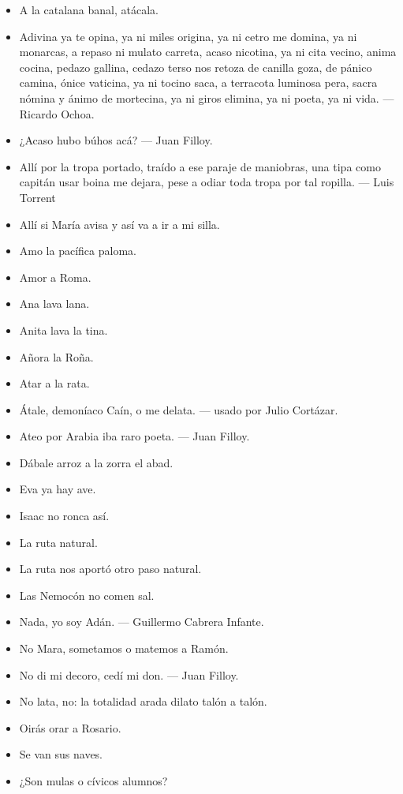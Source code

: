 \documentclass[10pt,a4paper]{article}
\begin{document}
	\begin{itemize}
		\item A la catalana banal, atácala.
		\item Adivina ya te opina, ya ni miles origina, ya ni cetro me domina, ya ni monarcas, a repaso ni mulato carreta, acaso nicotina, ya ni cita vecino, anima cocina, pedazo gallina, cedazo terso nos retoza de canilla goza, de pánico camina, ónice vaticina, ya ni tocino saca, a terracota luminosa pera, sacra nómina y ánimo de mortecina, ya ni giros elimina, ya ni poeta, ya ni vida. --- Ricardo Ochoa.
		\item ¿Acaso hubo búhos acá? --- Juan Filloy.
		\item Allí por la tropa portado, traído a ese paraje de maniobras, una tipa como capitán usar boina me dejara, pese a odiar toda tropa por tal ropilla. --- Luis Torrent
		\item Allí si María avisa y así va a ir a mi silla.
		\item Amo la pacífica paloma.
		\item Amor a Roma.
		\item Ana lava lana.
		\item Anita lava la tina.
		\item Añora la Roña.
		\item Atar a la rata.
		\item Átale, demoníaco Caín, o me delata. --- usado por Julio Cortázar.
		\item Ateo por Arabia iba raro poeta. --- Juan Filloy.
		\item Dábale arroz a la zorra el abad.
		\item Eva ya hay ave.
		\item Isaac no ronca así.
		\item La ruta natural.
		\item La ruta nos aportó otro paso natural.
		\item Las Nemocón no comen sal.
		\item Nada, yo soy Adán. --- Guillermo Cabrera Infante.
		\item No Mara, sometamos o matemos a Ramón.
		\item No di mi decoro, cedí mi don. --- Juan Filloy.
		\item No lata, no: la totalidad arada dilato talón a talón.
		\item Oirás orar a Rosario.
		\item Se van sus naves.
		\item ¿Son mulas o cívicos alumnos?	
	\end{itemize}
\end{document}
